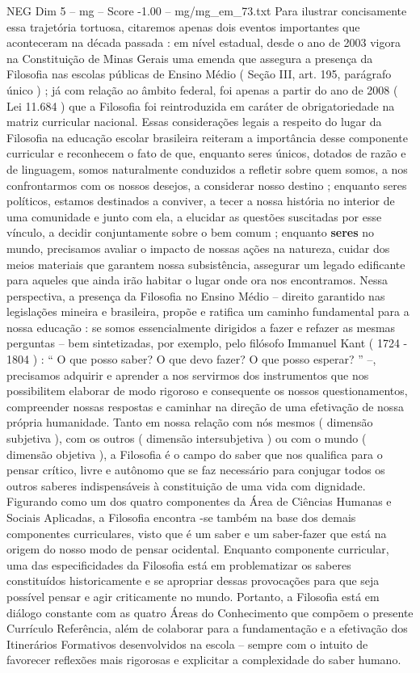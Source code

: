 \begin{textsample}{NEG Dim 5 – mg – Score -1.00 – mg/mg\_em\_73.txt}
Para ilustrar concisamente essa trajetória tortuosa, citaremos apenas dois eventos importantes que aconteceram na década passada : em nível estadual, desde o ano de 2003 vigora na Constituição de Minas Gerais uma emenda que assegura a presença da Filosofia nas escolas públicas de Ensino Médio ( Seção III, art. 195, parágrafo único ) ; já com relação ao âmbito federal, foi apenas a partir do ano de 2008 ( Lei 11.684 ) que a Filosofia foi reintroduzida em caráter de obrigatoriedade na matriz curricular nacional.
Essas considerações legais a respeito do lugar da Filosofia na educação escolar brasileira reiteram a importância desse componente curricular e reconhecem o fato de que, enquanto seres únicos, dotados de razão e de linguagem, somos naturalmente conduzidos a refletir sobre quem somos, a nos confrontarmos com os nossos desejos, a considerar nosso destino ; enquanto seres políticos, estamos destinados a conviver, a tecer a nossa história no interior de uma comunidade e junto com ela, a elucidar as questões suscitadas por esse vínculo, a decidir conjuntamente sobre o bem comum ; enquanto \textbf{seres} no mundo, precisamos avaliar o impacto de nossas ações na natureza, cuidar dos meios materiais que garantem nossa subsistência, assegurar um legado edificante para aqueles que ainda irão habitar o lugar onde ora nos encontramos.
Nessa perspectiva, a presença da Filosofia no Ensino Médio – direito garantido nas legislações mineira e brasileira, propõe e ratifica um caminho fundamental para a nossa educação : se somos essencialmente dirigidos a fazer e refazer as mesmas perguntas – bem sintetizadas, por exemplo, pelo filósofo Immanuel Kant ( 1724 - 1804 ) : “ O que posso saber?
O que devo fazer?
O que posso esperar? ” –, precisamos adquirir e aprender a nos servirmos dos instrumentos que nos possibilitem elaborar de modo rigoroso e consequente os nossos questionamentos, compreender nossas respostas e caminhar na direção de uma efetivação de nossa própria humanidade.
Tanto em nossa relação com nós mesmos ( dimensão subjetiva ), com os outros ( dimensão intersubjetiva ) ou com o mundo ( dimensão objetiva ), a Filosofia é o campo do saber que nos qualifica para o pensar crítico, livre e autônomo que se faz necessário para conjugar todos os outros saberes indispensáveis à constituição de uma vida com dignidade.
Figurando como um dos quatro componentes da Área de Ciências Humanas e Sociais Aplicadas, a Filosofia encontra -se também na base dos demais componentes curriculares, visto que é um saber e um saber-fazer que está na origem do nosso modo de pensar ocidental.
Enquanto componente curricular, uma das especificidades da Filosofia está em problematizar os saberes constituídos historicamente e se apropriar dessas provocações para que seja possível pensar e agir criticamente no mundo.
Portanto, a Filosofia está em diálogo constante com as quatro Áreas do Conhecimento que compõem o presente Currículo Referência, além de colaborar para a fundamentação e a efetivação dos Itinerários Formativos desenvolvidos na escola – sempre com o intuito de favorecer reflexões mais rigorosas e explicitar a complexidade do saber humano.

\end{textsample}
